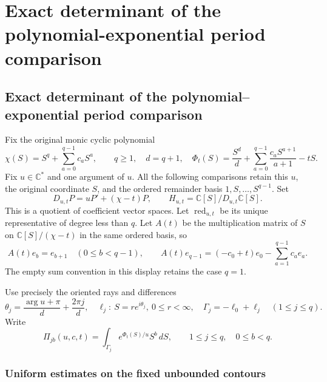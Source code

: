 \begingroup

\section{Exact determinant of the polynomial-exponential period comparison}


\subsection{Exact determinant of the polynomial--exponential period comparison}
\label{sec:exponential-period-determinant-exact}

Fix the original monic cyclic polynomial
\[
 \chi(S)=S^q+\sum_{a=0}^{q-1}c_aS^a,\qquad q\geq1,
 \quad d=q+1,
 \quad\Phi_t(S)=\frac{S^d}{d}
       +\sum_{a=0}^{q-1}\frac{c_aS^{a+1}}{a+1}-tS.
\]
Fix $u\in\mathbb C^*$ and one argument of $u$. All the following
comparisons retain this $u$, the original coordinate $S$, and the
ordered remainder basis $1,S,\ldots,S^{q-1}$. Set
\[
 D_{u,t}P=uP'+(\chi-t)P,
 \qquad H_{u,t}=\mathbb C[S]/D_{u,t}\mathbb C[S].
\]
This is a quotient of coefficient vector spaces. Let
$\operatorname{red}_{u,t}$ be its unique representative of degree
less than $q$. Let $A(t)$ be the multiplication matrix of $S$ on
$\mathbb C[S]/(\chi-t)$ in the same ordered basis, so
\[
 A(t)e_b=e_{b+1}\quad(0\leq b<q-1),\qquad
 A(t)e_{q-1}=(-c_0+t)e_0-\sum_{a=1}^{q-1}c_ae_a.
 \tag{XD1}
\]
The empty sum convention in this display retains the case $q=1$.

Use precisely the oriented rays and differences
\[
 \theta_j=\frac{\arg u+\pi}{d}+\frac{2\pi j}{d},\quad
 \ell_j:\ S=re^{i\theta_j},\ 0\leq r<\infty,
 \quad\Gamma_j=-\ell_0+\ell_j\quad(1\leq j\leq q).
 \tag{XD2}
\]
Write
\[
 \Pi_{jb}(u,c,t)=\int_{\Gamma_j}e^{\Phi_t(S)/u}S^b\,dS,
 \qquad 1\leq j\leq q,\quad0\leq b<q.
 \tag{XD3}
\]

\subsubsection{Uniform estimates on the fixed unbounded contours}

